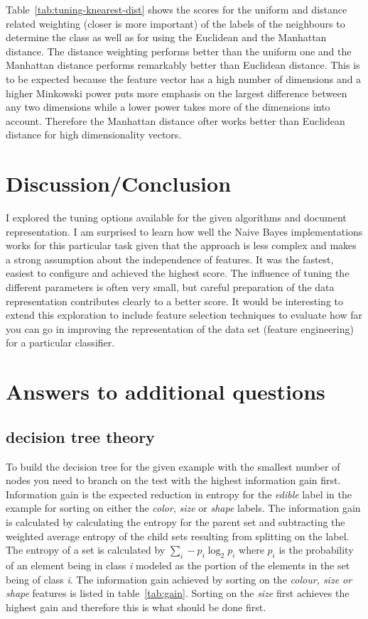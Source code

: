 \documentclass[11pt]{article}
\begin{document}
Table~\ref{tab:tuning-knearest-dist} shows the scores for the uniform and distance related weighting (closer is more important) of the labels of the neighbours to determine the class as well as for using the Euclidean and the Manhattan distance. The distance weighting performs better than the uniform one and the Manhattan distance performs remarkably better than Euclidean distance. This is to be expected because the feature vector has a high number of dimensions and a higher Minkowski power puts more emphasis on the largest difference between any two dimensions while a lower power takes more of the dimensions into account. Therefore the Manhattan distance ofter works better than Euclidean distance for high dimensionality vectors.

\section{Discussion/Conclusion}

I explored the tuning options available for the given algorithms and document representation. I am surprised to learn how well the Naive Bayes implementations works for this particular task given that the approach is less complex and makes a strong assumption about the independence of features. It was the fastest, easiest to configure and achieved the highest score. The influence of tuning the different parameters is often very small, but careful preparation of the data representation contributes clearly to a better score. It would be interesting to extend this exploration to include feature selection techniques to evaluate how far you can go in improving the representation of the data set (feature engineering) for a particular classifier.

\section{Answers to additional questions}

\subsection{decision tree theory}

To build the decision tree for the given example with the smallest number of nodes you need to branch on the test with the highest information gain first. Information gain is the expected reduction in entropy for the \emph{edible} label in the example for sorting on either the \emph{color}, \emph{size} or \emph{shape} labels. The information gain is calculated by calculating the entropy for the parent set and subtracting the weighted average entropy of the child sets resulting from splitting on the label. The entropy of a set is calculated by $\sum\limits_i - p_i \log_2 p_i $ where $p_i$ is the probability of an element being in class \emph{i} modeled as the portion of the elements in the set being of class \emph{i}. The information gain achieved by sorting on the \emph{colour, size or shape} features is listed in table~\ref{tab:gain}. Sorting on the \emph{size} first achieves the highest gain and therefore this is what should be done first.
\end{document}
